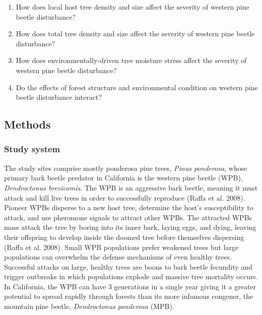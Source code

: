 \documentclass[]{article}
\begin{document}
\begin{enumerate}
\def\labelenumi{\arabic{enumi}.}
\item
  How does local host tree density and size affect the severity of
  western pine beetle disturbance?
\item
  How does total tree density and size affect the severity of western
  pine beetle disturbance?
\item
  How does environmentally-driven tree moisture stress affect the
  severity of western pine beetle disturbance?
\item
  Do the effects of forest structure and environmental condition on
  western pine beetle disturbance interact?
\end{enumerate}

\subsection{Methods}\label{methods}

\subsubsection{Study system}\label{study-system}

The study sites comprise mostly ponderosa pine trees, \emph{Pinus
ponderosa}, whose primary bark beetle predator in California is the
western pine beetle (WPB), \emph{Dendroctonus brevicomis}. The WPB is an
aggressive bark beetle, meaning it must attack and kill live trees in
order to successfully reproduce (Raffa et al. 2008). Pioneer WPBs
disperse to a new host tree, determine the host's susceptibility to
attack, and use pheromone signals to attract other WPBs. The attracted
WPBs mass attack the tree by boring into its inner bark, laying eggs,
and dying, leaving their offspring to develop inside the doomed tree
before themselves dispersing (Raffa et al. 2008). Small WPB populations
prefer weakened trees but large populations can overwhelm the defense
mechanisms of even healthy trees. Successful attacks on large, healthy
trees are boons to bark beetle fecundity and trigger outbreaks in which
populations explode and massive tree mortality occurs. In California,
the WPB can have 3 generations in a single year giving it a greater
potential to spread rapidly through forests than its more infamous
congener, the mountain pine beetle, \emph{Dendroctonus ponderosa} (MPB).
\end{document}
